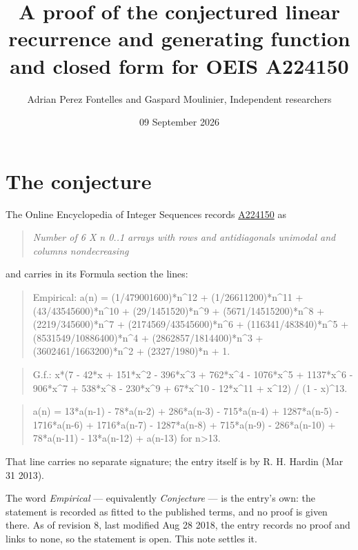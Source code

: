 \documentclass[11pt]{article}
\title{A proof of the conjectured linear recurrence and generating function and closed form for OEIS A224150}
\author{Adrian Perez Fontelles and Gaspard Moulinier, Independent researchers}
\date{09 September 2026}
\theoremstyle{definition}
\begin{document}
\maketitle
\section{The conjecture}

The Online Encyclopedia of Integer Sequences records \href{https://oeis.org/A224150}{A224150} as

\begin{quote}\itshape Number of 6 X n 0..1 arrays with rows and antidiagonals unimodal and columns nondecreasing\end{quote}

and carries in its Formula section the lines:

\begin{quote}\ttfamily Empirical: a(n) = (1/479001600)*n\textasciicircum{}12 + (1/26611200)*n\textasciicircum{}11 + (43/43545600)*n\textasciicircum{}10 + (29/1451520)*n\textasciicircum{}9 + (5671/14515200)*n\textasciicircum{}8 + (2219/345600)*n\textasciicircum{}7 + (2174569/43545600)*n\textasciicircum{}6 + (116341/483840)*n\textasciicircum{}5 + (8531549/10886400)*n\textasciicircum{}4 + (2862857/1814400)*n\textasciicircum{}3 + (3602461/1663200)*n\textasciicircum{}2 + (2327/1980)*n + 1.\end{quote}

\begin{quote}\ttfamily G.f.: x*(7 - 42*x + 151*x\textasciicircum{}2 - 396*x\textasciicircum{}3 + 762*x\textasciicircum{}4 - 1076*x\textasciicircum{}5 + 1137*x\textasciicircum{}6 - 906*x\textasciicircum{}7 + 538*x\textasciicircum{}8 - 230*x\textasciicircum{}9 + 67*x\textasciicircum{}10 - 12*x\textasciicircum{}11 + x\textasciicircum{}12) / (1 - x)\textasciicircum{}13.\end{quote}

\begin{quote}\ttfamily a(n) = 13*a(n-1) - 78*a(n-2) + 286*a(n-3) - 715*a(n-4) + 1287*a(n-5) - 1716*a(n-6) + 1716*a(n-7) - 1287*a(n-8) + 715*a(n-9) - 286*a(n-10) + 78*a(n-11) - 13*a(n-12) + a(n-13) for n>13.\end{quote}

That line carries no separate signature; the entry itself is by R. H. Hardin (Mar 31 2013).

The word {\itshape Empirical} --- equivalently {\itshape Conjecture} --- is the entry's own: the statement is recorded as fitted to the published terms, and no proof is given there. As of revision 8, last modified Aug 28 2018, the entry records no proof and links to none, so the statement is open. This note settles it.
\end{document}
